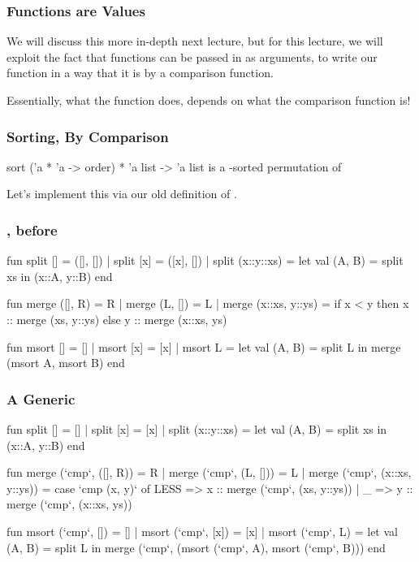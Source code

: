 \documentclass[aspectratio=169]{beamer}
\begin{document}
\begin{frame}[fragile]
  \frametitle{Functions are Values}

  We will discuss this more in-depth next lecture, but for this lecture, we will
  exploit the fact that functions can be passed in as arguments, to write our
   function in a way that it is  by a comparison
  function.

  \pause
  \vspace{\fill}

  Essentially, what the  function does, depends on what the comparison
  function is!
\end{frame}

\begin{frame}[fragile]
  \frametitle{Sorting, By Comparison}

  \spec
    {sort}
    {('a * 'a -> order) * 'a list -> 'a list}
    {}
    { is a -sorted permutation of }

  \pause
  \vspace{\fill}

  Let's implement this via our old definition of .
\end{frame}

\begin{frame}[fragile]
  \frametitle{, before}
  {\tiny
  \begin{codeblock}
    fun split [] = ([], [])
      | split [x] = ([x], [])
      | split (x::y::xs) =
          let
            val (A, B) = split xs
          in
            (x::A, y::B)
          end

    fun merge ([], R) = R
      | merge (L, []) = L
      | merge (x::xs, y::ys) =
          if x < y then
            x :: merge (xs, y::ys)
          else
            y :: merge (x::xs, ys)

    fun msort [] = []
      | msort [x] = [x]
      | msort L =
          let
            val (A, B) = split L
          in
            merge (msort A, msort B)
          end
  \end{codeblock}
  }
\end{frame}


\begin{frame}[fragile]
  \frametitle{A Generic }
  {\tiny
  \begin{codeblock}
    fun split [] = []
      | split [x] = [x]
      | split (x::y::xs) =
          let
            val (A, B) = split xs
          in
            (x::A, y::B)
          end

    fun merge (`cmp`, ([], R)) = R
      | merge (`cmp`, (L, [])) = L
      | merge (`cmp`, (x::xs, y::ys)) =
          case `cmp (x, y)` of
            LESS => x :: merge (`cmp`, (xs, y::ys))
          | _ => y :: merge (`cmp`, (x::xs, ys))

    fun msort (`cmp`, []) = []
      | msort (`cmp`, [x]) = [x]
      | msort (`cmp`, L) =
          let
            val (A, B) = split L
          in
            merge (`cmp`, (msort (`cmp`, A), msort (`cmp`, B)))
          end
  \end{codeblock}
  }
\end{frame}
\end{document}
